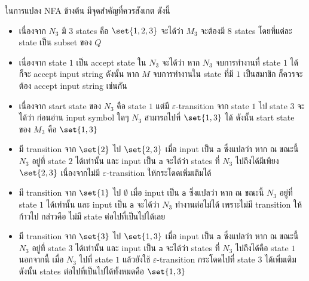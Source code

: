 \begin{example}
\begin{center}
\end{center}
ในการแปลง NFA ข้างต้น มีจุดสำคัญที่ควรสังเกต ดังนี้
\begin{itemize}
\item เนื่องจาก $N_3$ มี 3 states คือ $\set{1,2,3}$ จะได้ว่า $M_3$ จะต้องมี 8 states โดยที่แต่ละ state เป็น subset ของ $Q$
\item เนื่องจาก state $1$ เป็น accept state ใน $N_3$ จะได้ว่า หาก $N_3$ จบการทำงานที่ state $1$ ได้ ก็จะ accept input string \enskip ดังนั้น หาก $M$ จบการทำงานใน state ที่มี $1$ เป็นสมาชิก ก็ควรจะต้อง accept input string เช่นกัน
\item เนื่องจาก start state ของ $N_3$ คือ state $1$ แต่มี $\varepsilon$-transition จาก state $1$ ไป state $3$ จะได้ว่า ก่อนอ่าน input symbol ใดๆ $N_3$ สามารถไปที่ $\set{1,3}$ ได้ \enskip ดังนั้น start state ของ $M_3$ คือ $\set{1,3}$
\item มี transition จาก $\set{2}$ ไป $\set{2,3}$ เมื่อ input เป็น \texttt{a} ซึ่งแปลว่า หาก ณ ขณะนี้ $N_3$ อยู่ที่ state $2$ ได้เท่านั้น และ input เป็น \texttt{a} จะได้ว่า states ที่ $N_3$ ไปถึงได้มีเพียง $\set{2,3}$ เนื่องจากไม่มี $\varepsilon$-transition ให้กระโดดเพิ่มเติมได้
\item มี transition จาก $\set{1}$ ไป $\emptyset$ เมื่อ input เป็น \texttt{a} ซึ่งแปลว่า หาก ณ ขณะนี้ $N_3$ อยู่ที่ state $1$ ได้เท่านั้น และ input เป็น \texttt{a} จะได้ว่า $N_3$ ทำงานต่อไม่ได้ เพราะไม่มี transition ให้ก้าวไป กล่าวคือ ไม่มี state ต่อไปที่เป็นไปได้เลย
\item มี transition จาก $\set{3}$ ไป $\set{1,3}$ เมื่อ input เป็น \texttt{a} ซึ่งแปลว่า หาก ณ ขณะนี้ $N_3$ อยู่ที่ state $3$ ได้เท่านั้น และ input เป็น \texttt{a} จะได้ว่า states ที่ $N_3$ ไปถึงได้คือ state $1$ \enskip นอกจากนี้ เมื่อ $N_3$ ไปที่ state $1$ แล้วยังใช้ $\varepsilon$-transition กระโดดไปที่ state $3$ ได้เพิ่มเติม \enskip ดังนั้น states ต่อไปที่เป็นไปได้ทั้งหมดคือ $\set{1,3}$

\end{itemize}
\end{example}
